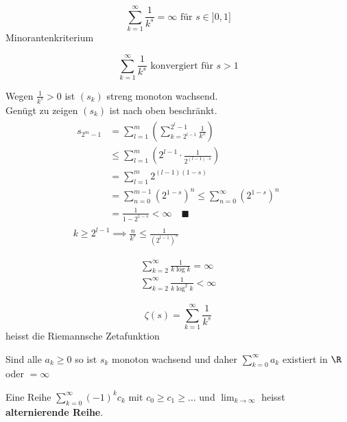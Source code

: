 \begin{bsp*}
	\[ \sum_{k=1}^\infty \frac{1}{k^s} = \infty \text{ für } s \in ]0,1] \]
	Minorantenkriterium
\end{bsp*}
\begin{bsp*}
	\[ \sum_{k=1}^\infty \frac{1}{k^s} \text{ konvergiert für } s > 1 \]
	\begin{bew}
		Wegen $\frac{1}{k^s} > 0$ ist $(s_k)$ streng monoton wachsend. \\
		Genügt zu zeigen $(s_k)$ ist nach oben beschränkt. \\
		\begin{gather*}
			\begin{split}
				s_{2^m - 1}	&= \sum_{l=1}^m \left( \sum_{k=2^{l-1}}^{2^l - 1} \frac{1}{k^s} \right) \\
							&\leq \sum_{l=1}^m \left( 2^{l-1} \cdot \frac{1}{2^{(l-1) \cdot s}} \right) \\
							&= \sum_{l=1}^m 2^{(l-1)(1-s)} \\
							&= \sum_{n=0}^{m-1} \left( 2^{1-s} \right)^n \leq \sum_{n=0}^\infty \left( 2^{1-s} \right)^n \\
							&= \frac{1}{1 - 2^{1-s}} < \infty \quad \blacksquare
			\end{split}\\
			k \geq 2^{l-1} \implies \frac{n}{k^s} \leq \frac{1}{(2^{l-1})^s}
		\end{gather*}
	\end{bew}
\end{bsp*}
\begin{bsp*}
	\begin{gather*}
		\sum_{k=2}^\infty \frac{1}{k \log k} = \infty \\
		\sum_{k=2}^\infty \frac{1}{k \log^2 k} < \infty
	\end{gather*}
\end{bsp*}
\begin{bem}
	\[ \zeta(s) = \sum_{k=1}^\infty \frac{1}{k^s}\]
	heisst die Riemannsche Zetafunktion
\end{bem}
\begin{bem}
	Sind alle $a_k \geq 0$ so ist $s_k$ monoton wachsend und daher $\sum_{k=0}^\infty a_k$ existiert in $\R$ oder $= \infty$
\end{bem}
\begin{def*}[note = alternierende Reihe , index = Reihe!alternierend]
	Eine Reihe $\sum_{k=0}^\infty (-1)^k c_k$ mit $c_0 \geq c_1 \geq \dots$ und $\lim_{k \rightarrow \infty}$ heisst \textbf{alternierende Reihe}. %
\end{def*}
